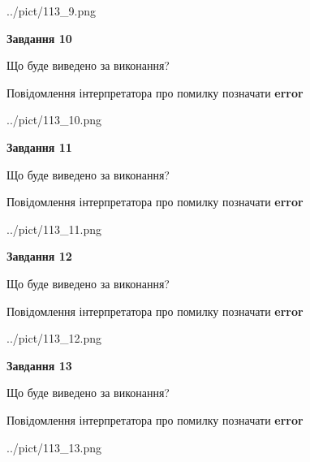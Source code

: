 \documentclass[11pt, ukrainian]{article}
\begin{document}
{\begin {large}
\begin{center}
	{../pict/113_9.png}
\end{center}
\newpage

{\begin {center}\textbf{Завдання 10}\end {center}}\par
Що буде виведено за виконання? \par
Повідомлення інтерпретатора про помилку позначати \textbf{error}

\begin{center}
	{../pict/113_10.png}
\end{center}
\newpage

{\begin {center}\textbf{Завдання 11}\end {center}}\par
Що буде виведено за виконання? \par
Повідомлення інтерпретатора про помилку позначати \textbf{error}

\begin{center}
	{../pict/113_11.png}
\end{center}
\newpage

{\begin {center}\textbf{Завдання 12}\end {center}}\par
Що буде виведено за виконання? \par
Повідомлення інтерпретатора про помилку позначати \textbf{error}

\begin{center}
	{../pict/113_12.png}
\end{center}
\newpage

{\begin {center}\textbf{Завдання 13}\end {center}}\par
Що буде виведено за виконання? \par
Повідомлення інтерпретатора про помилку позначати \textbf{error}

\begin{center}
	{../pict/113_13.png}
\end{center}
\newpage


\end{large}}
\end{document}
